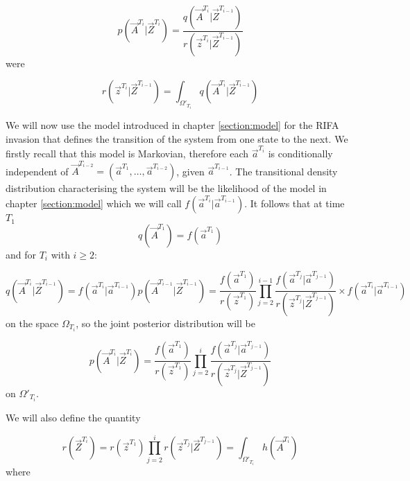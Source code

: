 {\begin{equation*}
    p(\vec{A}^{T_i} | \vec{Z}^{T_i}) = \frac{q(\vec{A}^{T_i} | \vec{Z}^{T_{i-1}})}{r(\vec{z}^{T_i} | \vec{Z}^{T_{i-1}})}
\end{equation*}
were

\begin{equation*}
    r(\vec{z}^{T_i} | \vec{Z}^{T_{i-1}}) = \int_{\Omega'_{T_i}} q(\vec{A}^{T_i} | \vec{Z}^{T_{i-1}})
\end{equation*}

We will now use the model introduced in chapter \ref{section:model} for the RIFA invasion that defines the transition of the system from one state to the next. We firstly recall that this model is Markovian, therefore each $\vec{a}^{T_i}$ is conditionally independent of $\vec{A}^{T_{i-2}} = (\vec{a}^{T_1}, \dots, \vec{a}^{T_{i-2}})$, given $\vec{a}^{T_{i-1}}$. The transitional density distribution characterising the system will be the likelihood of the model in chapter \ref{section:model} which we will call $f(\vec{a}^{T_i} | \vec{a}^{T_{i-1}})$. It follows that at time $T_1$
\begin{equation*}
    q(\vec{A}^{T_1}) = f(\vec{a}^{T_1})
\end{equation*}
and for $T_i$ with $i \geq 2$:

\begin{equation*}
    q(\vec{A}^{T_i} | \vec{Z}^{T_{i-1}}) = f(\vec{a}^{T_i} | \vec{a}^{T_{i-1}}) p(\vec{A}^{T_{i-1}} | \vec{Z}^{T_{i-1}}) = \frac{f(\vec{a}^{T_1})}{r(\vec{z}^{T_1})} \prod_{j=2}^{i-1} \frac{f(\vec{a}^{T_j} | \vec{a}^{T_{j-1}})}{r(\vec{z}^{T_j} | \vec{Z}^{T_{j-1}})} \times f(\vec{a}^{T_i} | \vec{a}^{T_{i-1}})
\end{equation*}
on the space $\Omega_{T_i}$, so the joint posterior distribution will be

\begin{equation*}
    p(\vec{A}^{T_i} | \vec{Z}^{T_i}) = \frac{f(\vec{a}^{T_1})}{r(\vec{z}^{T_1})} \prod_{j=2}^{i} \frac{f(\vec{a}^{T_j} | \vec{a}^{T_{j-1}})}{r(\vec{z}^{T_j} | \vec{Z}^{T_{j-1}})}
\end{equation*}
on $\Omega'_{T_i}$.

We will also define the quantity

\begin{equation*}
    r(\vec{Z}^{T_i}) = r(\vec{z}^{T_1}) \prod_{j=2}^{i} r(\vec{z}^{T_j} | \vec{Z}^{T_{j-1}}) = \int_{{\Omega}'_{T_{i}}} h(\vec{A}^{T_i})
\end{equation*}
where

}

